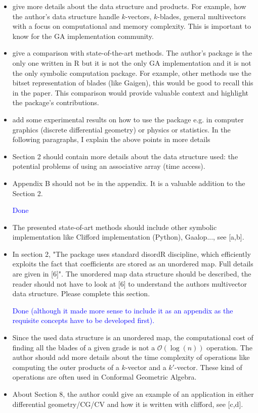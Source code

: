 \documentclass{article}
\begin{document}
\begin{itemize}
\item give more details about the data structure and products.  For
  example, how the author's data structure handle $k$-vectors,
  $k$-blades, general multivectors with a focus on computational and
  memory complexity.  This is important to know for the GA
  implementation community.

\item give a comparison with state-of-the-art methods.  The author's
  package is the only one written in R but it is not the only GA
  implementation and it is not the only symbolic computation
  package.  For example, other methods use the bitset representation of
  blades (like Gaigen), this would be good to recall this in the
  paper.  This comparison would provide valuable context and highlight
  the package's contributions.
  
\item add some experimental results on how to use the package e.g. in
  computer graphics (discrete differential geometry) or physics or
  statistics.  In the following paragraphs, I explain the above points
  in more details

\item Section 2 should contain more details about the data structure
  used: the potential problems of using an associative array (time
  access).

\item Appendix B should not be in the appendix.  It is a valuable
  addition to the Section 2.

  \textcolor{blue}{Done}
  
\item The presented state-of-art methods should include other symbolic
  implementation like Clifford implementation (Python), Gaalop..., see
  [a,b].

\item In section 2, "The package uses standard disordR discipline,
  which efficiently exploits the fact that coefficients are stored as
  an unordered map.  Full details are given in [6]".  The unordered
  map data structure should be described, the reader should not have
  to look at [6] to understand the authors multivector data
  structure. Please complete this section.

\textcolor{blue}{Done (although it made more sense to include it as an
  appendix as the requisite concepts have to be developed first).}
  
\item Since the used data structure is an unordered map, the
  computational cost of finding all the blades of a given grade is not
  a $\mathcal{O}(\log(n))$ operation.  The author should add more
  details about the time complexity of operations like computing the
  outer products of a $k$-vector and a $k'$-vector.  These kind of
  operations are often used in Conformal Geometric Algebra.

\item About Section 8, the author could give an example of an
  application in either differential geometry/CG/CV and how it is
  written with clifford, see [c,d].

\end{itemize}
\end{document}
